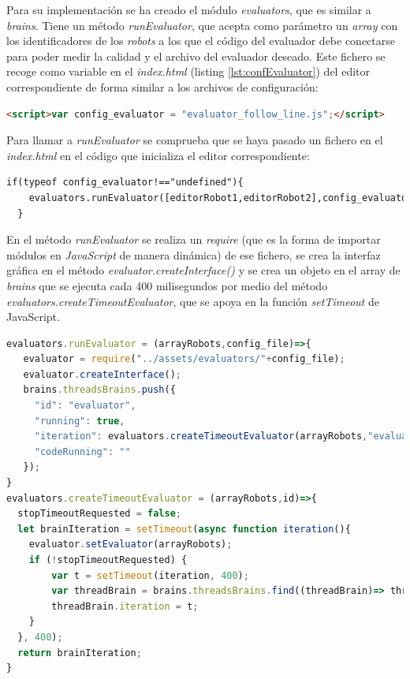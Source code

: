 Para su implementación se ha creado el módulo \textit{evaluators}, que es similar a \textit{brains}. Tiene un método \textit{runEvaluator}, que acepta como parámetro un \textit{array} con los identificadores de los \textit{robots} a los que el código del evaluador debe conectarse para poder medir la calidad y el archivo del evaluador deseado. Este fichero se recoge como variable en el \textit{index.html} (listing \ref{lst:confEvaluator}) del editor correspondiente de forma similar a los archivos de configuración:
\begin{lstlisting}[language=html,label=lst:confEvaluator]
   <script>var config_evaluator = "evaluator_follow_line.js";</script> 
\end{lstlisting}

Para llamar a \textit{runEvaluator} se comprueba que se haya pasado un fichero en el \textit{index.html} en el código que inicializa el editor correspondiente: 

\begin{lstlisting}[language=html,label=lst:checkFile]
   if(typeof config_evaluator!=="undefined"){
    evaluators.runEvaluator([editorRobot1,editorRobot2],config_evaluator);
  }
\end{lstlisting}

En el método \textit{runEvaluator} se realiza un \textit{require} (que es la forma de importar módulos en \textit{JavaScript} de manera dinámica) de ese fichero, se crea la interfaz gráfica en el método \textit{evaluator.createInterface()} y se crea un objeto en el array de \textit{brains} que se ejecuta cada 400 milisegundos por medio del método \textit{evaluators.createTimeoutEvaluator}, que se apoya en la función \textit{setTimeout} de JavaScript. 


\begin{lstlisting}[language=javascript,caption={Funciones que crean el objeto para ejecutar el evaluador periódicamente}]
evaluators.runEvaluator = (arrayRobots,config_file)=>{
   evaluator = require("../assets/evaluators/"+config_file);
   evaluator.createInterface();
   brains.threadsBrains.push({
     "id": "evaluator",
     "running": true,
     "iteration": evaluators.createTimeoutEvaluator(arrayRobots,"evaluator"),
     "codeRunning": ""
   });
}
evaluators.createTimeoutEvaluator = (arrayRobots,id)=>{
  stopTimeoutRequested = false;
  let brainIteration = setTimeout(async function iteration(){
    evaluator.setEvaluator(arrayRobots);
    if (!stopTimeoutRequested) {
        var t = setTimeout(iteration, 400);
        var threadBrain = brains.threadsBrains.find((threadBrain)=> threadBrain.id == id);
        threadBrain.iteration = t;
    }
  }, 400);
  return brainIteration;
}
\end{lstlisting}


